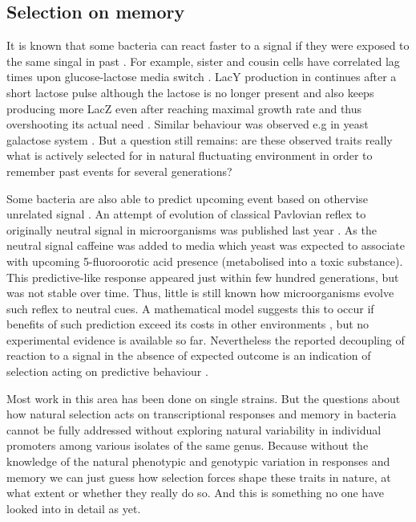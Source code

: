 \subsection{Selection on memory}
It is known that some bacteria can react faster to a signal if they were exposed to the same singal in past \cite{novick1957enzyme}.
For example, sister and cousin cells have correlated lag times upon glucose-lactose media switch \cite{boulineau2013single, kaiser2018monitoring}.
LacY production in  continues after a short lactose pulse although the lactose is no longer present \cite{lambert2014memory} and  also keeps producing more LacZ even after reaching maximal growth rate and thus overshooting its actual need \cite{kaiser2018monitoring}.
Similar behaviour was observed e.g in yeast galactose system \cite{zacharioudakis2007yeast, razinkov2013measuring}.
But a question still remains: are these observed traits really what is actively selected for in natural fluctuating environment in order to remember past events for several generations?

Some bacteria are also able to predict upcoming event based on othervise unrelated signal \cite{kondo1993circadian, min2005rhythmic, tagkopoulos2008predictive, mitchell2009adaptive}.
An attempt of evolution of classical Pavlovian reflex to originally neutral signal in microorganisms was published last year \cite{lopez2017adaptive}.
As the neutral signal caffeine was added to media which yeast  was expected to associate with upcoming 5-fluoroorotic acid presence (metabolised into a toxic substance).
This predictive-like response appeared just within few hundred generations, but was not stable over time.
Thus, little is still known how microorganisms evolve such reflex to neutral cues.
A mathematical model suggests this to occur if benefits of such prediction exceed its costs in other environments \cite{mitchell2011mathematical}, but no experimental evidence is available so far.
Nevertheless the reported decoupling of reaction to a signal in the absence of expected outcome is an indication of selection acting on predictive behaviour \cite{tagkopoulos2008predictive, mitchell2009adaptive}.

Most work in this area has been done on single strains.
But the questions about how natural selection acts on transcriptional responses and memory in bacteria cannot be fully addressed without exploring natural variability in individual promoters among various isolates of the same genus.
Because without the knowledge of the natural phenotypic and genotypic variation in responses and memory we can just guess how selection forces shape these traits in nature, at what extent or whether they really do so.
And this is something no one have looked into in detail as yet.


